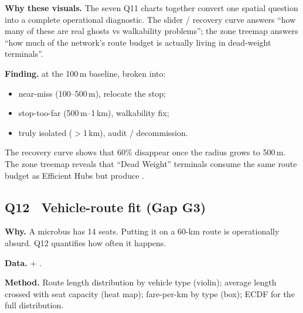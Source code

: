 \textbf{Why these visuals.} The seven Q11 charts together convert one
spatial question into a complete operational diagnostic. The slider /
recovery curve answers ``how many of these are real ghosts vs
walkability problems''; the zone treemap answers ``how much of the
network's route budget is actually living in dead-weight terminals''.

\textbf{Finding.}  at the 100\,m baseline,
broken into:
\begin{itemize}
 \item {} near-miss (100--500\,m), relocate the stop;
 \item {} stop-too-far (500\,m--1\,km), walkability fix;
 \item {} truly isolated ($>$1\,km), audit / decommission.
\end{itemize}
The recovery curve shows that 60\% disappear once the radius grows to
500\,m. The zone treemap reveals that ``Dead Weight'' terminals
consume the same route budget as Efficient Hubs but produce
. 

\subsection{Q12 \textbullet\ Vehicle-route fit (Gap G3)}

\textbf{Why.} A microbus has 14 seats. Putting it on a 60-km route is
operationally absurd. Q12 quantifies how often it happens.

\textbf{Data.}  +
.

\textbf{Method.} Route length distribution by vehicle type (violin);
average length crossed with seat capacity (heat map); fare-per-km by
type (box); ECDF for the full distribution.


